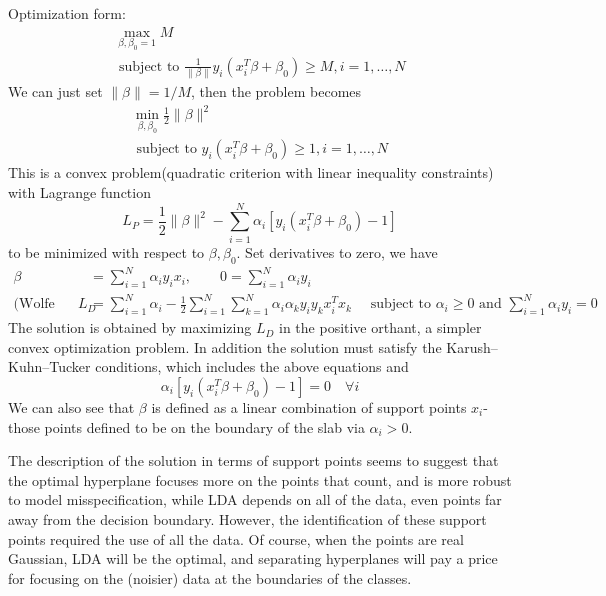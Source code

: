 Optimization form: 
\begin{equation*}
\begin{array}{c}{\max _{\beta, \beta_{0}=1} M} \\ 
{\text { subject to } \frac{1}{\|\beta\|}y_{i}\left(x_{i}^{T} \beta+\beta_{0}\right) 
\geq M, i=1, \ldots, N}\end{array}
\end{equation*}
We can just set $\|\beta\|=1/M$, then the problem becomes
\begin{equation*}
\begin{array}{c}{\min _{\beta, \beta_{0}} \frac{1}{2}\|\beta\|^{2}} \\ 
{\text { subject to } y_{i}\left(x_{i}^{T} \beta+\beta_{0}\right) \geq 1, i=1, 
\ldots, N}\end{array}
\end{equation*}
This is a convex problem(quadratic criterion with linear inequality constraints) 
with Lagrange function
\begin{equation*}
    L_{P}=\frac{1}{2}\|\beta\|^{2}-\sum_{i=1}^{N} \alpha_{i}\left[y_{i}
    \left(x_{i}^{T} \beta+\beta_{0}\right)-1\right]
\end{equation*}
to be minimized with respect to $\beta,\beta_0$. Set derivatives to zero, we have
\begin{align*}
\beta &=\sum_{i=1}^{N} \alpha_{i} y_{i} x_{i} ,\qquad
0 =\sum_{i=1}^{N} \alpha_{i} y_{i} \\ 
\text{(Wolfe Dual) }L_{D}&= \sum_{i=1}^{N} \alpha_{i}-\frac{1}{2} 
\sum_{i=1}^{N} \sum_{k=1}^{N} \alpha_{i} \alpha_{k} y_{i} y_{k} x_{i}^{T} x_{k} 
\quad\text { subject to } \alpha_{i} \geq 0 \text { and } \sum_{i=1}^{N} \alpha_{i} 
y_{i}=0
\end{align*}
The solution is obtained by maximizing $L_D$ in the positive orthant, a simpler
convex optimization problem. In addition the solution must satisfy the 
Karush–Kuhn–Tucker conditions, which includes the above equations and
\begin{equation*}
    \alpha_{i}\left[y_{i}\left(x_{i}^{T} \beta+\beta_{0}\right)-1\right]=0\quad \forall i
\end{equation*}
We can also see that $\beta$ is defined as a linear combination of support points 
$x_i$-those points defined to be on the boundary of the slab via $\alpha_i>0$. 

The description of the solution in terms of support points seems to suggest
that the optimal hyperplane focuses more on the points that count,
and is more robust to model misspecification, while LDA
depends on all of the data, even points far away from the decision
boundary. However, the identification of these support
points required the use of all the data. Of course, when the points are real Gaussian, 
LDA will be the optimal, and separating hyperplanes will pay a price
for focusing on the (noisier) data at the boundaries of the classes.

